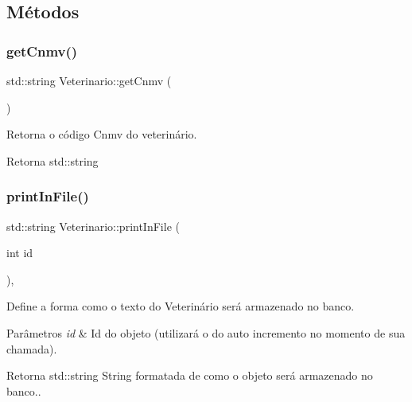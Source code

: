 \subsection{Métodos}
\mbox{\label{classVeterinario_a48fd50544ed6af0b8c454b8f6cb812c0}} 
\subsubsection{\texorpdfstring{get\+Cnmv()}{getCnmv()}}
{\footnotesize\ttfamily std\+::string Veterinario\+::get\+Cnmv (\begin{DoxyParamCaption}{ }\end{DoxyParamCaption})}



Retorna o código Cnmv do veterinário. 

\begin{DoxyReturn}{Retorna}
std\+::string 
\end{DoxyReturn}
\mbox{\label{classVeterinario_a9c922980caf0113e0e9048ea3528e88d}} 
\subsubsection{\texorpdfstring{print\+In\+File()}{printInFile()}}
{\footnotesize\ttfamily std\+::string Veterinario\+::print\+In\+File (\begin{DoxyParamCaption}\item[{int}]{id }\end{DoxyParamCaption})\hspace{0.3cm}{\ttfamily [protected]}, {\ttfamily [virtual]}}



Define a forma como o texto do Veterinário será armazenado no banco. 


\begin{DoxyParams}{Parâmetros}
{\em id} & Id do objeto (utilizará o do auto incremento no momento de sua chamada). \\
\hline
\end{DoxyParams}
\begin{DoxyReturn}{Retorna}
std\+::string String formatada de como o objeto será armazenado no banco.. 
\end{DoxyReturn}


